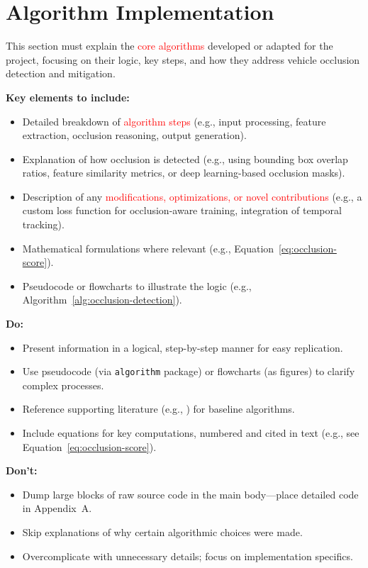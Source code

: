\documentclass[12pt,a4paper]{report}
\theoremstyle{definition}
\theoremstyle{remark}
\begin{document}
\section{Algorithm Implementation}
\label{sec:algorithm-implementation}

This section must explain the \textcolor{red}{core algorithms} developed or adapted for the project, focusing on their logic, key steps, and how they address vehicle occlusion detection and mitigation.

\noindent \textbf{Key elements to include:}
\begin{itemize}
    \item Detailed breakdown of \textcolor{red}{algorithm steps} (e.g., input processing, feature extraction, occlusion reasoning, output generation).
    \item Explanation of how occlusion is detected (e.g., using bounding box overlap ratios, feature similarity metrics, or deep learning-based occlusion masks).
    \item Description of any \textcolor{red}{modifications, optimizations, or novel contributions} (e.g., a custom loss function for occlusion-aware training, integration of temporal tracking).
    \item Mathematical formulations where relevant (e.g., Equation~\ref{eq:occlusion-score}).
    \item Pseudocode or flowcharts to illustrate the logic (e.g., Algorithm~\ref{alg:occlusion-detection}).
\end{itemize}

\noindent \textbf{Do:}
\begin{itemize}
    \item Present information in a logical, step-by-step manner for easy replication.
    \item Use pseudocode (via \texttt{algorithm} package) or flowcharts (as figures) to clarify complex processes.
    \item Reference supporting literature (e.g., \cite{article1,conference1}) for baseline algorithms.
    \item Include equations for key computations, numbered and cited in text (e.g., see Equation~\ref{eq:occlusion-score}).
\end{itemize}

\noindent \textbf{Don’t:}
\begin{itemize}
    \item Dump large blocks of raw source code in the main body—place detailed code in Appendix~A.
    \item Skip explanations of why certain algorithmic choices were made.
    \item Overcomplicate with unnecessary details; focus on implementation specifics.
\end{itemize}
\end{document}
